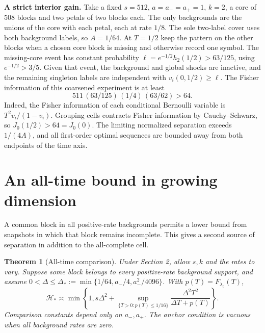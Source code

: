 \documentclass[11pt]{article}
\newtheorem{theorem}{Theorem}
\begin{document}
\textbf{A strict interior gain.} Take a fixed \(s=512\), \(a=a_-=a_+=1\), \(k=2\), a core of 508 blocks and two petals of two blocks each. The only backgrounds are the unions of the core with each petal, each at rate \(1/8\). The sole two-label cover uses both background labels, so \(A=1/64\). At \(T=1/2\) keep the pattern on the other blocks when a chosen core block is missing and otherwise record one symbol. The missing-core event has constant probability \(\ell=e^{-1/2}h_2(1/2)>63/125\), using \(e^{-1/2}>3/5\). Given that event, the background and global shocks are inactive, and the remaining singleton labels are independent with \(v_i(0,1/2)\ge\ell\). The Fisher information of this coarsened experiment is at least \[
511\,(63/125)\,(1/4)\,(63/62)>64.
\] Indeed, the Fisher information of each conditional Bernoulli variable is \(T^2v_i/(1-v_i)\). Grouping cells contracts Fisher information by Cauchy--Schwarz, so \(J_0(1/2)>64=J_0(0)\). The limiting normalized separation exceeds \(1/(4A)\), and all first-order optimal sequences are bounded away from both endpoints of the time axis.

\section{An all-time bound in growing dimension}\label{an-all-time-bound-in-growing-dimension}

A common block in all positive-rate backgrounds permits a lower bound from snapshots in which that block remains incomplete. This gives a second source of separation in addition to the all-complete cell.

\begin{theorem}[All-time comparison] Under Section 2, allow \(s,k\) and the rates to vary. Suppose some block belongs to every positive-rate background support, and assume \(0<\Delta\le\Delta_*:=\min\{1/64,a_-/4,a_-^2/4096\}\). With \(p(T)=F_{\lambda_0}(T)\), \[
\mathcal H_*\asymp \min\left\{1,s\Delta^2+
\sup_{\{T>0:p(T)\le1/16\}}\frac{\Delta^2T^2}{\Delta T+p(T)}\right\}.
\tag{12}
\] Comparison constants depend only on \(a_-,a_+\). The anchor condition is vacuous when all background rates are zero.

\end{theorem}
\end{document}
